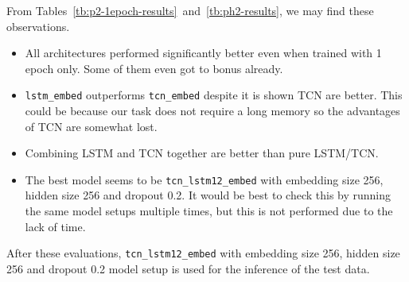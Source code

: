\documentclass[12pt]{article}
\begin{document}
\noindent From Tables~\ref{tb:p2-1epoch-results}~and~\ref{tb:ph2-results}, we may find these observations.
\begin{itemize}
	\item All architectures performed significantly better even when trained with 1 epoch only. Some of them even got to bonus already.
	\item \texttt{lstm\_embed} outperforms \texttt{tcn\_embed} despite it is shown TCN are better. This could be because our task does not require a long memory so the advantages of TCN are somewhat lost.
	\item Combining LSTM and TCN together are better than pure LSTM/TCN.
	\item The best model seems to be \texttt{tcn\_lstm12\_embed} with embedding size 256, hidden size 256 and dropout 0.2. It would be best to check this by running the same model setups multiple times, but this is not performed due to the lack of time.
\end{itemize}
After these evaluations, \texttt{tcn\_lstm12\_embed} with embedding size 256, hidden size 256 and dropout 0.2 model setup is used for the inference of the test data.
\end{document}
